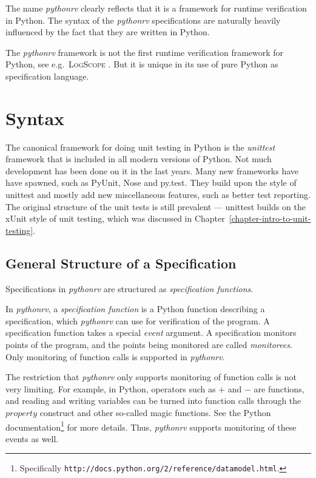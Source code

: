 The name \textit{pythonrv} clearly reflects that it is a framework for runtime
verification in Python. The syntax of the \textit{pythonrv} specifications are
naturally heavily influenced by the fact that they are written in Python.

The \textit{pythonrv} framework is not the first runtime verification framework
for Python, see e.g.\ \textsc{LogScope} \cite{barringer09tutorial}. But it is
  unique in its use of pure Python as specification language.


\section{Syntax} \label{section-approach-syntax}

The canonical framework for doing unit testing in Python is the
\textit{unittest} framework that is included in all modern versions of Python.
Not much development has been done on it in the last years. Many new frameworks
have have spawned, such as PyUnit, Nose and py.test. They build upon the style
of unittest and mostly add new miscellaneous features, such as better test
reporting. The original structure of the unit tests is still prevalent ---
unittest builds on the xUnit style of unit testing, which was discussed in
Chapter~\ref{chapter-intro-to-unit-testing}.

\subsection{General Structure of a Specification}

Specifications in \textit{pythonrv} are structured as \textit{specification
functions}.

\begin{mydef}\label{def-specification-function}
In \textit{pythonrv}, a \textit{specification function} is a Python function
describing a specification, which \textit{pythonrv} can use for verification of
the program. A specification function takes a special \textit{event} argument.
A specification monitors points of the program, and the points being monitored
are called \textit{monitorees}. Only monitoring of function calls is supported
in \textit{pythonrv}.
\end{mydef}

The restriction that \textit{pythonrv} only supports monitoring of function
calls is not very limiting. For example, in Python, operators such as $+$
and $-$ are functions, and reading and writing variables can be turned into
function calls through the $property$ construct and other so-called magic
functions. See the Python documentation\footnote{Specifically
\texttt{http://docs.python.org/2/reference/datamodel.html}.} for more details.
Thus, \textit{pythonrv} supports monitoring of these events as well.

